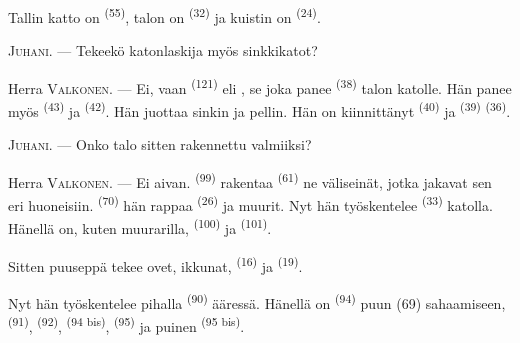 
Tallin katto on  \textsuperscript{(55)}, talon on
 \textsuperscript{(32)} ja kuistin on
 \textsuperscript{(24)}.

\textsc{Juhani}. --- Tekeekö katonlaskija myös sinkkikatot?

Herra \textsc{Valkonen}. --- Ei, vaan 
\textsuperscript{(121)} eli , se joka panee
 \textsuperscript{(38)} talon katolle. Hän panee myös
 \textsuperscript{(43)} ja 
\textsuperscript{(42)}. Hän juottaa sinkin ja pellin. Hän on kiinnittänyt
 \textsuperscript{(40)} ja 
\textsuperscript{(39)}  \textsuperscript{(36)}.

\textsc{Juhani}. --- Onko talo sitten rakennettu valmiiksi?

\VUsaut{3.0mm}
\VUsaut{3.0mm}

Herra \textsc{Valkonen}. --- Ei aivan. 
\textsuperscript{(99)} rakentaa  \textsuperscript{(61)} ne
väliseinät, jotka jakavat sen eri huoneisiin. 
\textsuperscript{(70)} hän rappaa  \textsuperscript{(26)} ja
muurit. Nyt hän työskentelee  \textsuperscript{(33)} katolla.
Hänellä on, kuten muurarilla,  \textsuperscript{(100)} ja
 \textsuperscript{(101)}.

Sitten puuseppä tekee ovet, ikkunat, 
\textsuperscript{(16)} ja  \textsuperscript{(19)}.

Nyt hän työskentelee pihalla  \textsuperscript{(90)}
ääressä. Hänellä on  \textsuperscript{(94)} puun (69) sahaamiseen,
 \textsuperscript{(91)}, 
\textsuperscript{(92)},  \textsuperscript{(94 bis)},
 \textsuperscript{(95)} ja puinen 
\textsuperscript{(95 bis)}.


